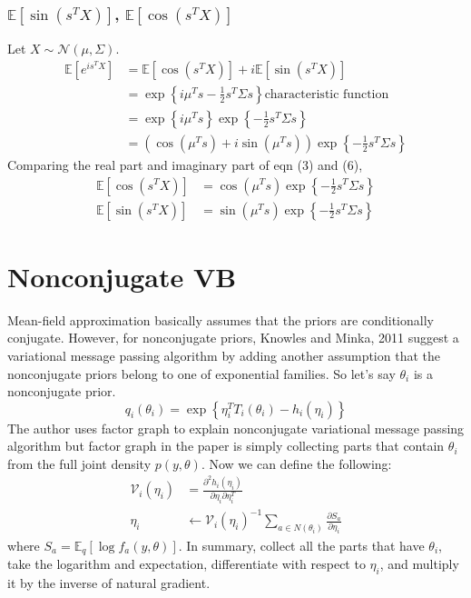 \documentclass[11pt]{article}
\begin{document}
\subsubsection{$\mathbb{E}\left[\sin \left(s^{T}X\right)\right]$, $\mathbb{E}\left[\cos \left(s^{T}X\right)\right]$}
Let $X \sim \mathcal{N}\left(\mu, \Sigma \right)$.
\begin{align}
  \mathbb{E}\left[e^{is^{T}X}\right] &= \mathbb{E}\left[\cos \left(s^{T}X\right)\right] + i \mathbb{E}\left[\sin \left(s^{T}X\right)\right] \\
  &= \exp \left\{i\mu^{T}s - \frac{1}{2}s^{T}\Sigma s \right\}  \text{characteristic function}\\
  &= \exp \left\{i\mu^{T}s \right\} \exp \left\{-\frac{1}{2}s^{T}\Sigma s \right\}\\
  &= \left(\cos \left(\mu^{T}s\right)+i\sin \left(\mu^{T}s \right)\right)\exp \left\{-\frac{1}{2}s^{T}\Sigma s \right\}
\end{align}
Comparing the real part and imaginary part of eqn (3) and (6),
\begin{align*}
  \mathbb{E}\left[\cos \left(s^{T}X \right)\right] &= \cos \left(\mu^{T}s\right)\exp \left\{-\frac{1}{2}s^{T}\Sigma s \right\}\\
  \mathbb{E}\left[\sin \left(s^{T}X\right)\right] &= \sin \left(\mu^{T}s\right)\exp \left\{-\frac{1}{2}s^{T}\Sigma s \right\}
\end{align*}
\section{Nonconjugate VB}
Mean-field approximation basically assumes that the priors are conditionally conjugate. However, for nonconjugate priors, Knowles and Minka, 2011 suggest a variational message passing algorithm by adding another assumption that the nonconjugate priors belong to one of exponential families. So let's say $\theta_{i}$ is a nonconjugate prior.
$$
  q_{i}\left(\theta_{i} \right) = \exp \left\{\eta_{i}^{T}T_{i}\left(\theta_{i}\right) - h_{i}\left(\eta_{i}\right) \right\}
$$
The author uses factor graph to explain nonconjugate variational message passing algorithm but factor graph in the paper is simply collecting parts that contain $\theta_{i}$ from the full joint density $p\left(y, \theta \right)$. Now we can define the following:
\begin{align*}
  \mathcal{V}_{i}\left(\eta_{i}\right) &= \frac{\partial^{2} h_{i}\left(\eta_{i}\right)}{\partial \eta_{i}\partial \eta_{i}^{T}}\\
  \eta_{i} &\leftarrow \mathcal{V}_{i}\left(\eta_{i}\right)^{-1} \sum_{a \in N\left(\theta_{i}\right)} \frac{\partial S_{a}}{\partial \eta_{i}}
\end{align*}
where $S_{a}=\mathbb{E}_{q}\left[\log f_{a}\left(y, \theta \right) \right]$. In summary, collect all the parts that have $\theta_{i}$, take the logarithm and expectation, differentiate with respect to $\eta_{i}$, and multiply it by the inverse of natural gradient.
\end{document}
